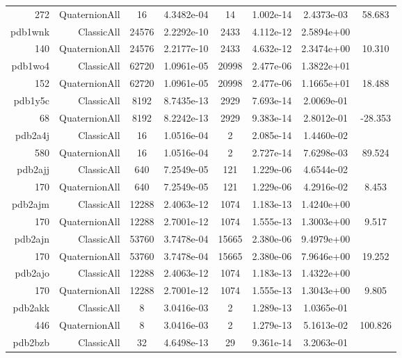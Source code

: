 \begin{xltabular}{\textwidth}{r|rcS[table-format=1.4e+2]cS[table-format=1.3e+2]S[table-format=1.4e+2]S[table-format=-1.3]}
272 & QuaternionAll & 16 & 4.3482e-04 & 14 & 1.002e-14 & 2.4373e-03 & 58.683\\  \addlinespace
pdb1wnk & ClassicAll & 24576 & 2.2292e-10 & 2433 & 4.112e-12 & 2.5894e+00 & \\
140 & QuaternionAll & 24576 & 2.2177e-10 & 2433 & 4.632e-12 & 2.3474e+00 & 10.310\\  \addlinespace
pdb1wo4 & ClassicAll & 62720 & 1.0961e-05 & 20998 & 2.477e-06 & 1.3822e+01 & \\
152 & QuaternionAll & 62720 & 1.0961e-05 & 20998 & 2.477e-06 & 1.1665e+01 & 18.488\\  \addlinespace
pdb1y5c & ClassicAll & 8192 & 8.7435e-13 & 2929 & 7.693e-14 & 2.0069e-01 & \\
68 & QuaternionAll & 8192 & 8.2242e-13 & 2929 & 9.383e-14 & 2.8012e-01 & -28.353\\  \addlinespace
pdb2a4j & ClassicAll & 16 & 1.0516e-04 & 2 & 2.085e-14 & 1.4460e-02 & \\
580 & QuaternionAll & 16 & 1.0516e-04 & 2 & 2.727e-14 & 7.6298e-03 & 89.524\\  \addlinespace
pdb2ajj & ClassicAll & 640 & 7.2549e-05 & 121 & 1.229e-06 & 4.6544e-02 & \\
170 & QuaternionAll & 640 & 7.2549e-05 & 121 & 1.229e-06 & 4.2916e-02 & 8.453\\  \addlinespace
pdb2ajm & ClassicAll & 12288 & 2.4063e-12 & 1074 & 1.183e-13 & 1.4240e+00 & \\
170 & QuaternionAll & 12288 & 2.7001e-12 & 1074 & 1.555e-13 & 1.3003e+00 & 9.517\\  \addlinespace
pdb2ajn & ClassicAll & 53760 & 3.7478e-04 & 15665 & 2.380e-06 & 9.4979e+00 & \\
170 & QuaternionAll & 53760 & 3.7478e-04 & 15665 & 2.380e-06 & 7.9646e+00 & 19.252\\  \addlinespace
pdb2ajo & ClassicAll & 12288 & 2.4063e-12 & 1074 & 1.183e-13 & 1.4322e+00 & \\
170 & QuaternionAll & 12288 & 2.7001e-12 & 1074 & 1.555e-13 & 1.3043e+00 & 9.805\\  \addlinespace
pdb2akk & ClassicAll & 8 & 3.0416e-03 & 2 & 1.289e-13 & 1.0365e-01 & \\
446 & QuaternionAll & 8 & 3.0416e-03 & 2 & 1.279e-13 & 5.1613e-02 & 100.826\\  \addlinespace
pdb2bzb & ClassicAll & 32 & 4.6498e-13 & 29 & 9.361e-14 & 3.2063e-01 & \\

\end{xltabular}
